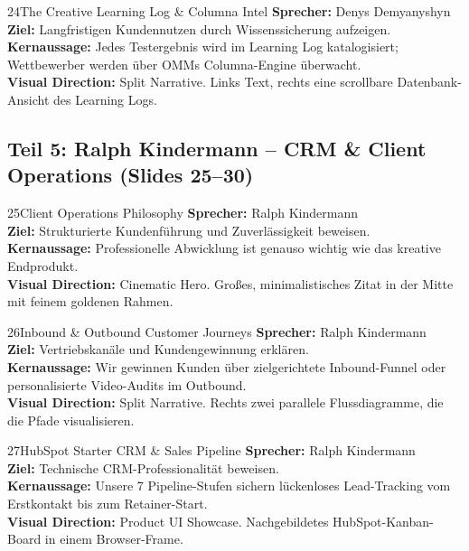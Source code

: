 \documentclass[11pt,a4paper]{article}
\begin{document}
\begin{slidebox}{24}{The Creative Learning Log \& Columna Intel}
    \textbf{Sprecher:} Denys Demyanyshyn \\
    \textbf{Ziel:} Langfristigen Kundennutzen durch Wissenssicherung aufzeigen.\\
    \textbf{Kernaussage:} Jedes Testergebnis wird im Learning Log katalogisiert; Wettbewerber werden über OMMs Columna-Engine überwacht.\\
    \textbf{Visual Direction:} Split Narrative. Links Text, rechts eine scrollbare Datenbank-Ansicht des Learning Logs.
\end{slidebox}

\newpage
\subsection{Teil 5: Ralph Kindermann -- CRM \& Client Operations (Slides 25--30)}

\begin{slidebox}{25}{Client Operations Philosophy}
    \textbf{Sprecher:} Ralph Kindermann \\
    \textbf{Ziel:} Strukturierte Kundenführung und Zuverlässigkeit beweisen.\\
    \textbf{Kernaussage:} Professionelle Abwicklung ist genauso wichtig wie das kreative Endprodukt.\\
    \textbf{Visual Direction:} Cinematic Hero. Großes, minimalistisches Zitat in der Mitte mit feinem goldenen Rahmen.
\end{slidebox}

\begin{slidebox}{26}{Inbound & Outbound Customer Journeys}
    \textbf{Sprecher:} Ralph Kindermann \\
    \textbf{Ziel:} Vertriebskanäle und Kundengewinnung erklären.\\
    \textbf{Kernaussage:} Wir gewinnen Kunden über zielgerichtete Inbound-Funnel oder personalisierte Video-Audits im Outbound.\\
    \textbf{Visual Direction:} Split Narrative. Rechts zwei parallele Flussdiagramme, die die Pfade visualisieren.
\end{slidebox}

\begin{slidebox}{27}{HubSpot Starter CRM \& Sales Pipeline}
    \textbf{Sprecher:} Ralph Kindermann \\
    \textbf{Ziel:} Technische CRM-Professionalität beweisen.\\
    \textbf{Kernaussage:} Unsere 7 Pipeline-Stufen sichern lückenloses Lead-Tracking vom Erstkontakt bis zum Retainer-Start.\\
    \textbf{Visual Direction:} Product UI Showcase. Nachgebildetes HubSpot-Kanban-Board in einem Browser-Frame.
\end{slidebox}
\end{document}
